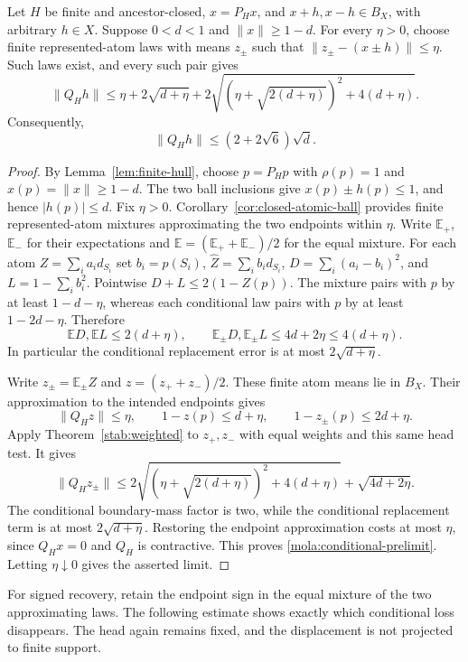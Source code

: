\begin{proposition}\label{mola:conditional}
Let $H$ be finite and ancestor-closed, $x=P_Hx$, and
$x+h,x-h\in B_X$, with arbitrary $h\in X$.
Suppose $0<d<1$ and $\|x\|\ge1-d$. For every $\eta>0$, choose
finite represented-atom laws with means $z_\pm$ such that
$\|z_\pm-(x\pm h)\|\le\eta$. Such laws exist, and every such pair gives
\begin{equation}\label{mola:conditional-prelimit}
 \|Q_Hh\|\le\eta+2\sqrt{d+\eta}
       +2\sqrt{(\eta+\sqrt{2(d+\eta)})^2+4(d+\eta)}.
\end{equation}
Consequently,
\[
 \|Q_Hh\|\le(2+2\sqrt6)\sqrt d.
\]
\end{proposition}
\begin{proof}
By Lemma~\ref{lem:finite-hull}, choose $p=P_Hp$ with
$\rho(p)=1$ and $x(p)=\|x\|\ge1-d$.
The two ball inclusions give $x(p)\pm h(p)\le1$, and hence
$|h(p)|\le d$.  Fix $\eta>0$.  Corollary~\ref{cor:closed-atomic-ball}
provides finite represented-atom mixtures approximating the two
endpoints within $\eta$.  Write
$\mathbb E_+$, $\mathbb E_-$ for their expectations and
$\mathbb E=(\mathbb E_++\mathbb E_-)/2$ for the equal mixture.
For each atom $Z=\sum_i a_i d_{S_i}$ set
$b_i=p(S_i)$, $\widehat Z=\sum_i b_i d_{S_i}$,
$D=\sum_i(a_i-b_i)^2$, and $L=1-\sum_i b_i^2$.
Pointwise $D+L\le2(1-Z(p))$.
The mixture pairs with $p$ by at least $1-d-\eta$, whereas each
conditional law pairs with $p$ by at least $1-2d-\eta$.  Therefore
\[
 \mathbb ED,\mathbb EL\le2(d+\eta),\qquad
 \mathbb E_\pm D,\mathbb E_\pm L\le4d+2\eta\le4(d+\eta).
\]
In particular the conditional replacement error is at most
$2\sqrt{d+\eta}$.

Write $z_\pm=\mathbb E_\pm Z$ and $z=(z_++z_-)/2$.
These finite atom means lie in $B_X$. Their approximation to the
intended endpoints gives
\[
 \|Q_Hz\|\le\eta,\qquad
 1-z(p)\le d+\eta,\qquad 1-z_\pm(p)\le2d+\eta.
\]
Apply Theorem~\ref{stab:weighted} to $z_+,z_-$ with equal weights
and this same head test. It gives
\[
 \|Q_Hz_\pm\|
 \le2\sqrt{(\eta+\sqrt{2(d+\eta)})^2+4(d+\eta)}
       +\sqrt{4d+2\eta}.
\]
The conditional boundary-mass factor is two, while the conditional
replacement term is at most $2\sqrt{d+\eta}$. Restoring the endpoint
approximation costs at most $\eta$, since $Q_Hx=0$ and $Q_H$ is
contractive. This proves \eqref{mola:conditional-prelimit}.
Letting $\eta\downarrow0$ gives the asserted limit.
\end{proof}
For signed recovery, retain the endpoint sign in the equal mixture of
the two approximating laws. The following estimate shows exactly which
conditional loss disappears. The head again remains fixed, and the
displacement is not projected to finite support.

